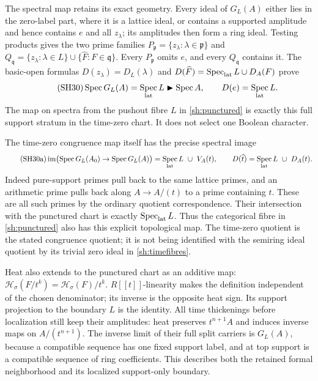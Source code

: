 \documentclass[11pt]{article}
\DeclareMathOperator{\Spec}{Spec}
\DeclareMathOperator{\im}{im}
\newcommand{\Ht}{\mathcal H}
\begin{document}
The spectral map retains its exact geometry. Every ideal of
$G_L(A)$ either lies in the zero-label part, where it is a
lattice ideal, or contains a supported amplitude and hence
contains $e$ and all $z_\lambda$; its amplitudes then form a
ring ideal. Testing products gives the two prime families
$P_{\mathfrak p}=\{z_\lambda:\lambda\in\mathfrak p\}$ and
$Q_{\mathfrak q}=\{z_\lambda:\lambda\in L\}
\cup\{\widehat F:F\in\mathfrak q\}$.
Every $P_{\mathfrak p}$ omits $e$, and every $Q_{\mathfrak q}$
contains it. The basic-open formulas
$D(z_\lambda)=D_L(\lambda)$ and
$D(\widehat F)=\Spec_{\rm lat}L\cup D_A(F)$ prove
\begin{equation}\tag{SH30}\label{sh:spectrum}
 \Spec G_L(A)=\Spec_{\rm lat}L\blacktriangleright\Spec A,\qquad
 D(e)=\Spec_{\rm lat}L.
\end{equation}
The map on spectra from the pushout fibre $L$ in
\eqref{sh:punctured} is exactly this full support stratum in
the time-zero chart. It does not select one Boolean character.

The time-zero congruence map itself has the precise spectral image
\begin{equation}\tag{SH30a}\label{sh:intersection}
 \im\bigl(\Spec G_L(A_0)\to\Spec G_L(A)\bigr)
   =\Spec_{\rm lat}L\ \cup\ V_A(t),\qquad
 D(\widehat t)=\Spec_{\rm lat}L\ \cup\ D_A(t).
\end{equation}
Indeed pure-support primes pull back to the same lattice primes,
and an arithmetic prime pulls back along $A\to A/(t)$ to a
prime containing $t$. These are all such primes by the ordinary
quotient correspondence. Their intersection with the punctured
chart is exactly $\Spec_{\rm lat}L$. Thus the categorical fibre
in \eqref{sh:punctured} also has this explicit topological map.
The time-zero quotient is the stated congruence quotient; it is
not being identified with the semiring ideal quotient by its
trivial zero ideal in \eqref{sh:timefibres}.

Heat also extends to the punctured chart as an additive map:
$\Ht_\sigma(F/t^k)=\Ht_\sigma(F)/t^k$.
$R[[t]]$-linearity makes the definition independent of the
chosen denominator; its inverse is the opposite heat sign.
Its support projection to the boundary $L$ is the identity.
All time thickenings before localization still keep their
amplitudes: heat preserves $t^{n+1}A$ and induces inverse maps
on $A/(t^{n+1})$. The inverse limit of their full split carriers
is $G_L(A)$, because a compatible sequence has one fixed
support label, and at top support is a compatible sequence
of ring coefficients. This describes both the retained formal
neighborhood and its localized support-only boundary.
\end{document}
